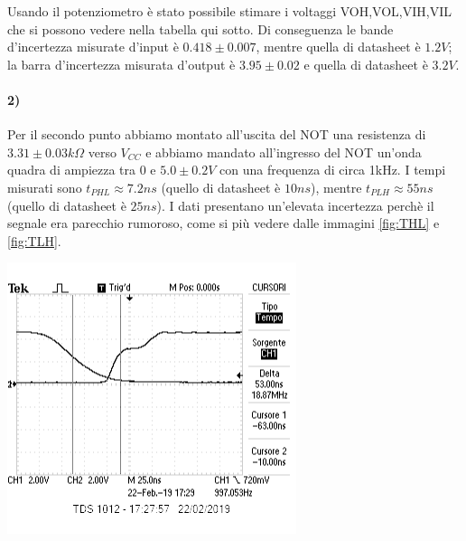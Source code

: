 \documentclass{article}
\begin{document}
	Usando il potenziometro è stato possibile stimare i voltaggi VOH,VOL,VIH,VIL che si possono vedere nella tabella qui sotto.\newline
	Di conseguenza le bande d'incertezza misurate d'input è $0.418\pm0.007$, mentre quella di datasheet è $1.2 V$; la barra d'incertezza misurata d'output è $3.95\pm0.02$ e quella di datasheet è $3.2 V$.
	\begin{center}
		
	\end{center}

\paragraph{2)}
	Per il secondo punto abbiamo montato all'uscita del NOT una resistenza di $3.31\pm0.03 k\Omega$ verso $V_{CC}$ e abbiamo mandato all'ingresso del NOT un'onda quadra di ampiezza tra $0$ e $5.0\pm0.2 V$ con una frequenza di circa 1kHz.
	I tempi misurati sono $t_{PHL}\approx7.2ns$ (quello di datasheet è $10ns$), mentre $t_{PLH}\approx55ns$ (quello di datasheet è $25ns$).
	I dati presentano un'elevata incertezza perchè il segnale era parecchio rumoroso, come si più vedere dalle immagini \ref{fig:THL} e \ref{fig:TLH}.
	\begin{minipage}{.5\linewidth}
		\centering
		\includegraphics[width=\linewidth]{figure/THL}
		\label{fig:THL}
	\end{minipage}
\end{document}
